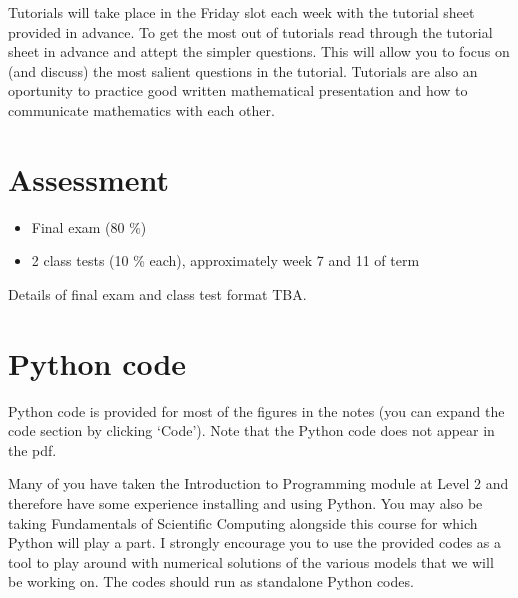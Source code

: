 \documentclass[
  letterpaper,
  DIV=11,
  numbers=noendperiod]{scrreprt}
\providecommand{\tightlist}{%
  \setlength{\itemsep}{0pt}\setlength{\parskip}{0pt}}
\begin{document}

Tutorials will take place in the Friday slot each week with the tutorial
sheet provided in advance. To get the most out of tutorials read through
the tutorial sheet in advance and attept the simpler questions. This
will allow you to focus on (and discuss) the most salient questions in
the tutorial. Tutorials are also an oportunity to practice good written
mathematical presentation and how to communicate mathematics with each
other.

\section*{Assessment}\label{assessment}


\begin{itemize}
\tightlist
\item
  Final exam (80 \%)
\item
  2 class tests (10 \% each), approximately week 7 and 11 of term
\end{itemize}

Details of final exam and class test format TBA.

\section*{Python code}\label{python-code}


Python code is provided for most of the figures in the notes (you can
expand the code section by clicking `Code'). Note that the Python code
does not appear in the pdf.

Many of you have taken the Introduction to Programming module at Level 2
and therefore have some experience installing and using Python. You may
also be taking Fundamentals of Scientific Computing alongside this
course for which Python will play a part. I strongly encourage you to
use the provided codes as a tool to play around with numerical solutions
of the various models that we will be working on. The codes should run
as standalone Python codes.
\end{document}
